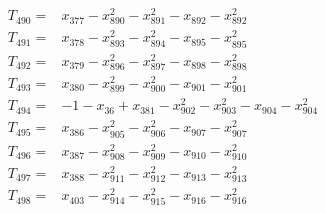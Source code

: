 \begin{align*}
T_{490}={}&x_{377}-x_{890}^{2}-x_{891}^{2}-x_{892}-x_{892}^{2}\\[3pt]
T_{491}={}&x_{378}-x_{893}^{2}-x_{894}^{2}-x_{895}-x_{895}^{2}\\[3pt]
T_{492}={}&x_{379}-x_{896}^{2}-x_{897}^{2}-x_{898}-x_{898}^{2}\\[3pt]
T_{493}={}&x_{380}-x_{899}^{2}-x_{900}^{2}-x_{901}-x_{901}^{2}\\[3pt]
T_{494}={}&-1-x_{36}+x_{381}-x_{902}^{2}-x_{903}^{2}-x_{904}-x_{904}^{2}\\[3pt]
T_{495}={}&x_{386}-x_{905}^{2}-x_{906}^{2}-x_{907}-x_{907}^{2}\\[3pt]
T_{496}={}&x_{387}-x_{908}^{2}-x_{909}^{2}-x_{910}-x_{910}^{2}\\[3pt]
T_{497}={}&x_{388}-x_{911}^{2}-x_{912}^{2}-x_{913}-x_{913}^{2}\\[3pt]
T_{498}={}&x_{403}-x_{914}^{2}-x_{915}^{2}-x_{916}-x_{916}^{2}\\[3pt]
\end{align*}
\endgroup
